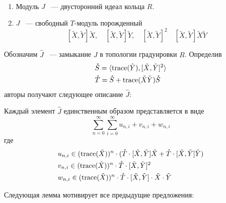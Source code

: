 \begin{proposition}\\
    \begin{enumerate}
        \item Модуль $J$ ~--- двусторонний идеал кольца $R$.
        \item $J$ ~--- свободный $T$-модуль порожденный \[[\tilde{X}, \tilde{Y}] \tilde{X}, \quad [\tilde{X}, \tilde{Y}] \tilde{Y}, \quad [\tilde{X}, \tilde{Y}]^2 \quad [\tilde{X}, \tilde{Y}]\tilde{X}\tilde{Y}\]
    \end{enumerate}
\end{proposition}
Обозначим $\hat{J}$ ~--- замыкание $J$ в топологии градуировки $R$.
Определив
\begin{align*}
    & \mathring{S} = \langle \mathrm{trace}(\tilde{Y}), [\tilde{X}, \tilde{Y}]^2 \rangle \\
    & \mathring{T} = \mathring{S} + \mathrm{trace}(\tilde{X}\tilde{Y}) \mathring{S}
\end{align*}
авторы получают следующее описание $\hat{J}$:
\begin{proposition}
    Каждый элемент $\hat{J}$ единственным образом представляется в виде
    \[
        \sum\limits_{n=0}^{\infty}\sum\limits_{i=0}^{\infty}
        u_{n,i} + v_{n,i} + w_{n,i}
    \]
    где
    \begin{align*}
        & u_{n,i} \in (\mathrm{trace}(\tilde{X}))^n \cdot (\mathring{T}\cdot[\tilde{X}, \tilde{Y}]\tilde{X} + \mathring{T}\cdot[\tilde{X}, \tilde{Y}]\tilde{Y}) \\
        & v_{n,i} \in (\mathrm{trace}(\tilde{X}))^n \cdot \mathring{T} \cdot [\tilde{X}, \tilde{Y}]^2 \\
        & w_{n,i} \in (\mathrm{trace}(\tilde{X}))^n \cdot \mathring{T} \cdot [\tilde{X}, \tilde{Y}]\cdot \tilde{X} \cdot \tilde{Y}
    \end{align*}
\end{proposition}

Следующая лемма мотивирует все предыдущие предложения:
